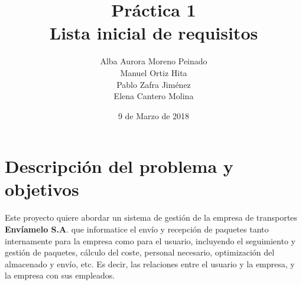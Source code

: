 \documentclass[a4paper, 11pt]{article}
\title{\textbf{Pr\'actica 1}\\ \textbf{Lista inicial de requisitos}}
\author{Alba Aurora Moreno Peinado\\ Manuel Ortiz Hita \\ Pablo Zafra Jim\'enez \\ Elena Cantero Molina}
\date{9 de Marzo de 2018}
\begin{document}
\maketitle
{\parskip=20pt\tableofcontents}

\setlength{\parskip}{5pt}

\section{Descripci\'on del problema y objetivos}
Este proyecto quiere abordar un sistema de gesti\'on de la empresa de transportes \textbf{Env\'iamelo S.A}. que informatice el env\'io y recepci\'on de paquetes tanto internamente para la empresa como para el usuario, incluyendo  el seguimiento y gesti\'on de paquetes, c\'alculo del coste, personal necesario, optimizaci\'on del almacenado y env\'io, etc. Es decir, las relaciones entre el usuario y la empresa, y la empresa con sus empleados.\\
\end{document}
